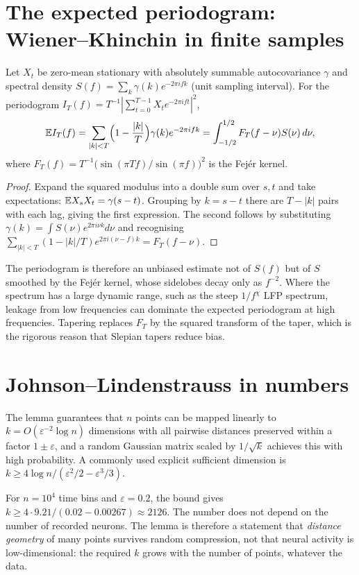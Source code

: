 \section{The expected periodogram: Wiener--Khinchin in finite samples}
Let $X_t$ be zero-mean stationary with absolutely summable autocovariance
$\gamma$ and spectral density $S(f)=\sum_k\gamma(k)e^{-2\pi ifk}$ (unit
sampling interval). For the periodogram
$I_T(f)=T^{-1}|\sum_{t=0}^{T-1}X_te^{-2\pi ift}|^2$,
\[
\mathbb{E} I_T(f)=\sum_{|k|<T}\Bigl(1-\frac{|k|}T\Bigr)\gamma(k)e^{-2\pi ifk}
=\int_{-1/2}^{1/2}F_T(f-\nu)S(\nu)\,d\nu,
\]
where $F_T(f)=T^{-1}\bigl(\sin(\pi Tf)/\sin(\pi f)\bigr)^2$ is the Fej\'er kernel.
\begin{proof}
Expand the squared modulus into a double sum over $s,t$ and take
expectations: $\mathbb{E} X_s X_t=\gamma(s-t)$. Grouping by $k=s-t$ there are
$T-|k|$ pairs with each lag, giving the first expression. The second
follows by substituting $\gamma(k)=\int S(\nu)e^{2\pi i\nu k}d\nu$ and
recognising $\sum_{|k|<T}(1-|k|/T)e^{2\pi i(\nu-f)k}=F_T(f-\nu)$.
\end{proof}
The periodogram is therefore an unbiased estimate not of $S(f)$ but of
$S$ smoothed by the Fej\'er kernel, whose sidelobes decay only as
$f^{-2}$. Where the spectrum has a large dynamic range, such as the steep
$1/f^\chi$ LFP spectrum, leakage from low frequencies can dominate the
expected periodogram at high frequencies. Tapering replaces $F_T$ by the
squared transform of the taper, which is the rigorous reason that
Slepian tapers reduce bias.

\section{Johnson--Lindenstrauss in numbers}
The lemma guarantees that $n$ points can be mapped linearly to
$k=O(\varepsilon^{-2}\log n)$ dimensions with all pairwise distances
preserved within a factor $1\pm\varepsilon$, and a random Gaussian matrix
scaled by $1/\sqrt k$ achieves this with high probability. A commonly
used explicit sufficient dimension is
$k\ge4\log n/(\varepsilon^2/2-\varepsilon^3/3)$.
\begin{example}
For $n=10^4$ time bins and $\varepsilon=0.2$, the bound gives
$k\ge4\cdot9.21/(0.02-0.00267)\approx2126$. The number does not depend on
the number of recorded neurons. The lemma is therefore a statement that
\emph{distance geometry} of many points survives random compression,
not that neural activity is low-dimensional: the required $k$ grows with
the number of points, whatever the data.
\end{example}

